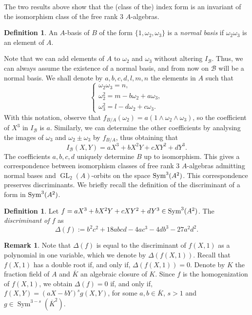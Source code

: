 \documentclass[oneside]{amsart}
\newcommand{\syma}{\textnormal{Sym}^3(A^2)}
\DeclareMathOperator{\gl}{GL}
\DeclareMathOperator{\sym}{Sym}
\theoremstyle{definition}
\newtheorem{definition}[X]{Definition}
\newtheorem{remark}[X]{Remark}
\begin{document}
The two  results above show that the (class of the) index form is an invariant of the isomorphism class of the free rank 3 $A$-algebras. 

\begin{definition}{\cite[p.104]{Delone2009TheTO}}
    An $A$-basis of $B$ of the form $\{1, \omega_2, \omega_3\}$ is a \textit{normal basis} if $\omega_2\omega_3$ is an element of $A$.
\end{definition}
Note that we can add elements of $A$ to $\omega_2$ and $\omega_3$ without altering $I_{\mathcal{B}}$. Thus, we can always assume the existence of a normal basis, and from now on $\mathcal{B}$ will be a normal basis. We shall denote by $a, b,c,d,l,m,n$ the elements in $A$ such that 
$$
\begin{cases}
    \omega_2\omega_3 = n,\\
    \omega_2^2 = m - b\omega_2 + a\omega_3,\\
    \omega_3^2 = l - d\omega_2 + c\omega_3.
\end{cases}
$$
With this notation, observe that $f_{B/A}(\omega_2) = a(1\wedge\omega_2\wedge\omega_3)$, so the coefficient of $X^3$ in $I_{\mathcal{B}}$ is $a$. Similarly, we can determine the other coefficients by analysing the images of $\omega_3$ and $\omega_2\pm\omega_3$ by $f_{B/A}$, thus obtaining that
\begin{equation}
    I_{\mathcal{B}}(X,Y) = aX^3 + bX^2Y + cXY^2 + dY^3.
\end{equation}
The coefficients $a,b,c,d$ uniquely determine $B$ up to isomorphism. This gives a correspondence between isomorphism classes of free rank 3 $A$-algebras admitting normal bases and $\gl_2(A)$-orbits on the space $\syma$. This correspondence preserves discriminants. We briefly recall the definition of  the discriminant of a form in $\syma$.

\begin{definition}
    Let $f = aX^3 + bX^2Y + cXY^2 + dY^3 \in \syma$.  The \textit{discriminant of $f$} as 
    $$
    \Delta(f) := b^2c^2 + 18abcd - 4ac^3 - 4db^3 - 27a^2d^2.
    $$
\end{definition}
\begin{remark}
    Note that $\Delta(f)$ is equal to the discriminant of $f(X,1)$ as a polynomial in one variable, which we denote by $\Delta(f(X,1))$. Recall that $f(X,1)$ has a double root if, and only if, $\Delta(f(X,1)) = 0$. Denote by $K$ the fraction field of $A$ and $\overline{K}$ an algebraic closure of $K$. Since $f$ is the homogenization of $f(X,1)$, we obtain $\Delta(f) = 0$ if, and only if, $f(X,Y) = (aX - bY)^sg(X,Y)$, for some $a, b\in \overline{K}$, $s > 1$ and $g \in \sym^{3 - s}(\overline{K}^2)$.
\end{remark}
\end{document}
